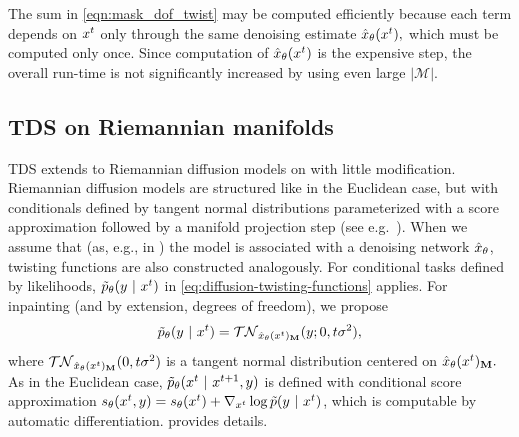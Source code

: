 The sum in \cref{eqn:mask_dof_twist} may be computed efficiently because each term depends on $x^{t}$ only through the same denoising estimate ${\hat x}_\theta(x^{t}),$
which must be computed only once.
Since computation of ${\hat x}_\theta(x^{t})$ is the expensive step, the overall run-time is not significantly increased by using even large $|\mathcal{M}|$.


\subsection{TDS on Riemannian manifolds}\label{sec:TDS_riemannian_main}
TDS extends to Riemannian diffusion models on with little modification.
Riemannian diffusion models \citep{deriemannian} are structured like in the Euclidean case, but with conditionals defined by tangent normal distributions parameterized with a score approximation followed by a manifold projection step (see e.g.\ \citep{chirikjian2014gaussian,deriemannian}). 
When we assume that (as, e.g., in \citep{yim2023se}) the model is associated with a denoising network ${\hat x}_\theta$, twisting functions are also constructed analogously.
For conditional tasks defined by likelihoods, $\tilde p_\theta(y~\vert~ x^{t})$ in \cref{eq:diffusion-twisting-functions} applies.
 For inpainting (and by extension, degrees of freedom), we propose 
 \begin{align}\label{eqn:tangent_normal}
     \tilde p_\theta(y~\vert~ x^{t}) = \mathcal{TN}_{{\hat x}_\theta(x^{t})_{\mathbf{M}}}(y ; 0, t \sigma^2),
      \end{align}
where $\mathcal{TN}_{{\hat x}_\theta(x^{t})_{\mathbf{M}}}(0, t \sigma^2)$ is a tangent normal distribution centered on ${\hat x}_\theta(x^{t})_{\mathbf{M}}.$
As in the Euclidean case, $\tilde p_\theta(x^{t} ~\vert~ x^{t+1}, y)$ is defined with 
conditional score approximation $s_\theta(x^{t},y)=s_\theta(x^{t}) + \nabla_{x^{t}} \log \tilde p(y ~\vert~ x^{t})$, which is computable by automatic differentiation.
 provides details.
